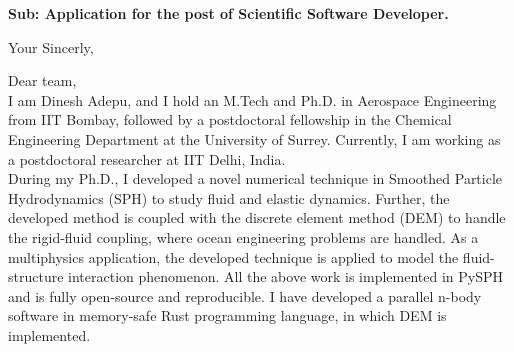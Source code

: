 \documentclass[11pt,a4paper,roman]{moderncv}
\begin{document}
\date{\today}
\opening{\textbf{Sub: Application for the post of Scientific Software Developer.}}
\closing{Your Sincerly, \vspace{-1em}}


\makelettertitle



Dear team,
\\
\vspace{1em}
I am Dinesh Adepu, and I hold an M.Tech and Ph.D. in Aerospace
Engineering from IIT Bombay, followed by a postdoctoral fellowship in
the Chemical Engineering Department at the University of
Surrey. Currently, I am working as a postdoctoral researcher at IIT
Delhi, India. \\


\vspace{1em}
 During my Ph.D., I developed a novel numerical technique
in Smoothed Particle Hydrodynamics (SPH) to study fluid and elastic
dynamics.  Further, the developed method is coupled with the discrete
element method (DEM) to handle the rigid-fluid coupling, where ocean
engineering problems are handled. As a multiphysics application, the
developed technique is applied to model the fluid-structure
interaction phenomenon. All the above work is implemented in PySPH and
is fully open-source and reproducible. I have developed a parallel
n-body software in memory-safe Rust programming language, in which DEM
is implemented. \\
\end{document}
